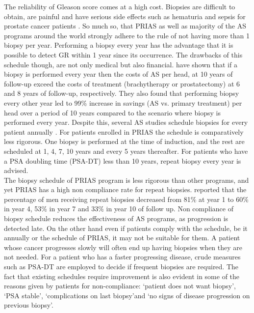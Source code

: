 The reliability of Gleason score comes at a high cost. Biopsies are difficult to obtain, are painful and have serious side effects such as hematuria and sepsis for prostate cancer patients \citep{loeb2013systematic}. So much so, that PRIAS as well as majority of the AS programs around the world strongly adhere to the rule of not having more than 1 biopsy per year. Performing a biopsy every year has the advantage that it is possible to detect GR within 1 year since its occurrence. The drawbacks of this schedule though, are not only medical but also financial. \cite{keegan2012active} have shown that if a biopsy is performed every year then the costs of AS per head, at 10 years of follow-up exceed the costs of treatment (brachytherapy or prostatectomy) at 6 and 8 years of follow-up, respectively. They also found that performing biopsy every other year led to 99\% increase in savings (AS vs. primary treatment) per head over a period of 10 years compared to the scenario where biopsy is performed every year. Despite this, several AS studies schedule biopsies for every patient annually \citep{tosoian2011active,welty2015extended}. For patients enrolled in PRIAS the schedule is comparatively less rigorous. One biopsy is performed at the time of induction, and the rest are scheduled at 1, 4, 7, 10 years and every 5 years thereafter. For patients who have a PSA doubling time (PSA-DT) less than 10 years, repeat biopsy every year is advised.\\

The biopsy schedule of PRIAS program is less rigorous than other programs, and yet PRIAS has a high non compliance rate for repeat biopsies. \cite{bokhorst2015compliance} reported that the percentage of men receiving repeat biopsies decreased from 81\% at year 1 to 60\% in year 4, 53\% in year 7 and 33\% in year 10 of follow up. Non compliance of biopsy schedule reduces the effectiveness of AS programs, as progression is detected late. On the other hand even if patients comply with the schedule, be it annually or the schedule of PRIAS, it may not be suitable for them. A patient whose cancer progresses slowly will often end up having biopsies when they are not needed. For a patient who has a faster progressing disease, crude measures such as PSA-DT are employed to decide if frequent biopsies are required. The fact that existing schedules require improvement is also evident in some of the reasons given by patients for non-compliance:  \textquoteleft patient does not want biopsy\textquoteright, \textquoteleft PSA stable\textquoteright, \textquoteleft complications on last biopsy\textquoteright and \textquoteleft no signs of disease progression on previous biopsy\textquoteright.\\ 

